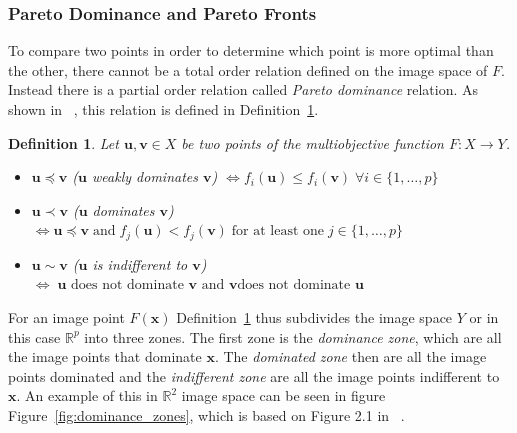 \documentclass[a4paper,10pt]{article}
\newtheorem{definition}{Definition}
\renewcommand{\vec}[1]{\mathbf{#1}}
\newcommand{\figref}[1]{Figure~\ref{#1}}
\newcommand{\defref}[1]{Definition~\ref{#1}}
\begin{document}
    \subsubsection{Pareto Dominance and Pareto Fronts} \label{sec:pareto}
    
    To compare two points in order to determine which point is more
    optimal than the other, there cannot be a total order relation defined
    on the image space of $F$.
    Instead there is a partial order relation called \emph{Pareto dominance}
    relation.
    As shown in ~\cite{multiobjective}, this relation is defined in
    \defref{def:pareto_dominance}.
    
    \begin{definition}
        \label{def:pareto_dominance}
        Let $\vec{u},\vec{v} \in X$ be two points of the multiobjective
        function $F: X \rightarrow Y$.
        \begin{itemize}
            \item $\vec{u} \preceq \vec{v}$ ($\vec{u}$ weakly dominates $\vec{v}$)
            $\Longleftrightarrow f_i(\vec{u}) \leq f_i(\vec{v}) \; \forall i \in \{1,\dots,p\}$   

            \item $\vec{u} \prec \vec{v}$ ($\vec{u}$ dominates $\vec{v}$)
            $\Longleftrightarrow \vec{u} \preceq \vec{v} \; \text{and} \; 
            f_j(\vec{u}) < f_j(\vec{v}) \; \text{for at least one} \; j \in \{1,\dots,p\}$   

            \item $\vec{u} \sim \vec{v}$ ($\vec{u}$ is indifferent to $\vec{v}$)
            $\Longleftrightarrow \; \text{$\vec{u}$ does not dominate $\vec{v}$ and $\vec{v}$
            does not dominate $\vec{u}$}$  
        \end{itemize}
    \end{definition}

    For an image point $F(\vec{x})$ \defref{def:pareto_dominance} thus
    subdivides the image space $Y$ or in this case $\mathbb{R}^p$ into three zones.
    The first zone is the \emph{dominance zone}, which are all the image
    points that dominate $\vec{x}$.
    The \emph{dominated zone} then are all the image points dominated and
    the \emph{indifferent zone} are all the image points indifferent to $\vec{x}$.
    An example of this in $\mathbb{R}^2$ image space can be seen in figure
    \figref{fig:dominance_zones}, which is based on Figure 2.1 in ~\cite{multiobjective}.
   
\end{document}
